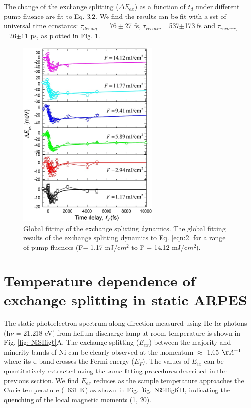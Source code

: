The change of the exchange splitting  ($\Delta E_{ex})$ as a function of $t_d$ under different pump fluence are fit to Eq. 3.2. We find the results can be fit with a set of universal time constants: $\tau_{demag}=176\pm$27 fs, $\tau_{recover_1}$=537$\pm$173 fs and $\tau_{recover_2}$=26$\pm$11 ps, as plotted in Fig. \ref{fig: NiSIfig5}.

\begin{figure}[htbp]
	\begin{center}
		\includegraphics[width=70mm]{figs/NiFigS5}
	\end{center}
	\caption{Global fitting of the exchange splitting dynamics. The global fitting results of the exchange splitting dynamics to Eq. \ref{eqn:2} for a range of pump fluences (F= 1.17 mJ/c$m^2$ to F = 14.12 mJ/c$m^2$).}
	\label{fig: NiSIfig5}
\end{figure}

\section{Temperature dependence of exchange splitting in static ARPES}
The static photoelectron spectrum along  direction measured using He I$\alpha$ photons (h$\nu$ = 21.218 eV) from helium discharge lamp at room temperature is shown in Fig. \ref{fig: NiSIfig6}A. The exchange splitting ($E_{ex}$) between the majority and minority bands of Ni can be clearly observed at the momentum  $\approx$ 1.05 $\AA^{-1}$ where its d band crosses the Fermi energy ($E_F$). The values of $E_{ex}$ can be quantitatively extracted using the same fitting procedures described in the previous section. We find $E_{ex}$ reduces as the sample temperature approaches the Curie temperature (~631 K) as shown in Fig. \ref{fig: NiSIfig6}B, indicating the quenching of the local magnetic moments (1, 20).

